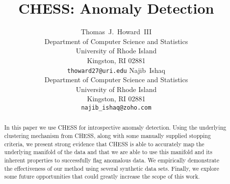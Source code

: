 \documentclass{article}
\title{CHESS: Anomaly Detection}
\author{
    Thomas~J.~Howard~III \\
    Department of Computer Science and Statistics\\
    University of Rhode Island \\
    Kingston, RI 02881 \\
    \texttt{thoward27@uri.edu}
    \And
    Najib~Ishaq \\
    Department of Computer Science and Statistics\\
    University of Rhode Island\\
    Kingston, RI 02881 \\
    \texttt{najib\_ishaq@zoho.com}
}
\begin{document}
\maketitle

\begin{abstract}
In this paper we use CHESS for introspective anomaly detection.
Using the underlying clustering mechanism from CHESS, along with some manually supplied stopping criteria, we present strong evidence that CHESS is able to accurately map the underlying manifold of the data and that we are able to use this manifold and its inherent properties to successfully flag anomalous data.
We empirically demonstrate the effectiveness of our method using several synthetic data sets.
Finally, we explore some future opportunities that could greatly increase the scope of this work.
\end{abstract}







\clearpage


\printbibliography
\end{document}
